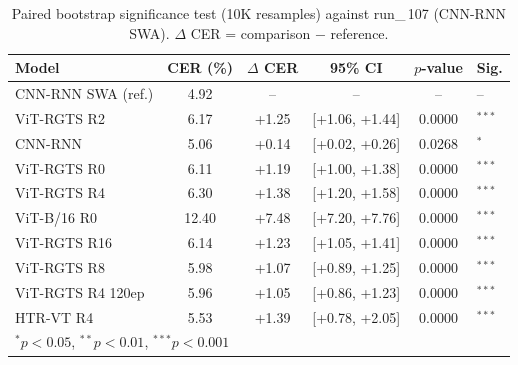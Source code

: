 \begin{table}[t]
\centering
\caption{Paired bootstrap significance test (10K resamples) against run\_{\,107} (CNN-RNN SWA). $\Delta$ CER = comparison $-$ reference.}
\label{tab:significance}
\begin{tabular}{lccccl}
\toprule
Model & CER (\%) & $\Delta$ CER & 95\% CI & $p$-value & Sig. \\
\midrule
CNN-RNN SWA (ref.) & 4.92 & -- & -- & -- & -- \\
\midrule
ViT-RGTS R2 & 6.17 & +1.25 & [+1.06, +1.44] & 0.0000 & $^{***}$ \\
CNN-RNN & 5.06 & +0.14 & [+0.02, +0.26] & 0.0268 & $^{*}$ \\
ViT-RGTS R0 & 6.11 & +1.19 & [+1.00, +1.38] & 0.0000 & $^{***}$ \\
ViT-RGTS R4 & 6.30 & +1.38 & [+1.20, +1.58] & 0.0000 & $^{***}$ \\
ViT-B/16 R0 & 12.40 & +7.48 & [+7.20, +7.76] & 0.0000 & $^{***}$ \\
ViT-RGTS R16 & 6.14 & +1.23 & [+1.05, +1.41] & 0.0000 & $^{***}$ \\
ViT-RGTS R8 & 5.98 & +1.07 & [+0.89, +1.25] & 0.0000 & $^{***}$ \\
ViT-RGTS R4 120ep & 5.96 & +1.05 & [+0.86, +1.23] & 0.0000 & $^{***}$ \\
HTR-VT R4 & 5.53 & +1.39 & [+0.78, +2.05] & 0.0000 & $^{***}$ \\
\bottomrule
\multicolumn{6}{l}{\footnotesize $^{*}p<0.05$, $^{**}p<0.01$, $^{***}p<0.001$} \\
\end{tabular}
\end{table}
